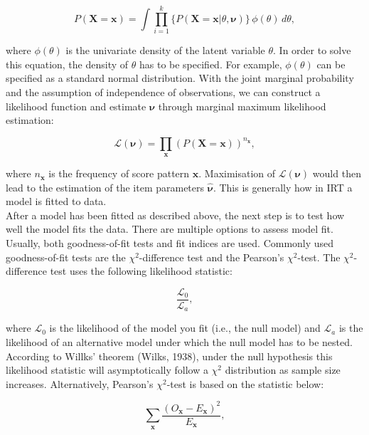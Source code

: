 \documentclass[Royal,sageapa,times,doublespace]{sagej}
\begin{document}
\begin{equation}
P(\boldsymbol{X} = \boldsymbol{x}) = \int \prod_{i=1}^{k} \{ P(\boldsymbol{X} = \boldsymbol{x} | \theta, \boldsymbol{\nu}) \} \,\phi(\theta)\,d\theta,
\end{equation}

where $\phi(\theta)$ is the univariate density of the latent variable $\theta$. In order to solve this equation, the density of $\theta$ has to be specified. For example, $\phi(\theta)$ can be specified as a standard normal distribution. With the joint marginal probability and the assumption of independence of observations, we can construct a likelihood function and estimate $\boldsymbol{\nu}$ through marginal maximum likelihood estimation:

\begin{equation}
\mathcal{L}(\boldsymbol{\nu}) = \prod_{\boldsymbol{x}} (P(\boldsymbol{X} = \boldsymbol{x}))^{n_{\boldsymbol{x}}},
\end{equation}

where $n_{\boldsymbol{x}}$ is the frequency of score pattern $\boldsymbol{x}$. Maximisation of $\mathcal{L}(\boldsymbol{\nu})$ would then lead to the estimation of the item parameters $\boldsymbol{\hat{\nu}}$. This is generally how in IRT a model is fitted to data. \\
\indent After a model has been fitted as described above, the next step is to test how well the model fits the data. There are multiple options to assess model fit. Usually, both goodness-of-fit tests and fit indices are used. Commonly used goodness-of-fit tests are the $\chi^2$-difference test and the Pearson's $\chi^2$-test. The $\chi^2$-difference test uses the following likelihood statistic:

\begin{equation}
\frac{\mathcal{L}_0}{\mathcal{L}_a},
\end{equation}

where $\mathcal{L}_0$ is the likelihood of the model you fit (i.e., the null model) and $\mathcal{L}_a$ is the likelihood of an alternative model under which the null model has to be nested. According to Willks' theorem (Wilks, 1938), under the null hypothesis this likelihood statistic will asymptotically follow a $\chi^2$ distribution as sample size increases. Alternatively, Pearson's $\chi^2$-test is based on the statistic below: 

\begin{equation}
\sum_{\boldsymbol{x}} \frac{(O_{\boldsymbol{x}} - E_{\boldsymbol{x}})^2}{E_{\boldsymbol{x}}},
\end{equation}
\end{document}
